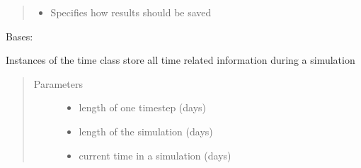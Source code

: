 \documentclass[letterpaper,10pt,english]{sphinxmanual}
\begin{document}
\begin{fulllineitems}
\begin{fulllineitems}
\begin{quote}
\begin{description}
\begin{itemize}
\item {} 
 \textendash{} Specifies how results should be saved

\end{itemize}

\end{description}\end{quote}

\end{fulllineitems}


\end{fulllineitems}


\begin{fulllineitems}
\label{\detokenize{index:feast.EmissionSimModules.simulation_classes.Time}}
Bases: 

Instances of the time class store all time related information during a simulation
\begin{quote}\begin{description}
\item[{Parameters}] \leavevmode\begin{itemize}
\item {} 
 \textendash{} length of one timestep (days)

\item {} 
 \textendash{} length of the simulation (days)

\item {} 
 \textendash{} current time in a simulation (days)

\end{itemize}

\end{description}\end{quote}

\end{fulllineitems}
\end{document}
